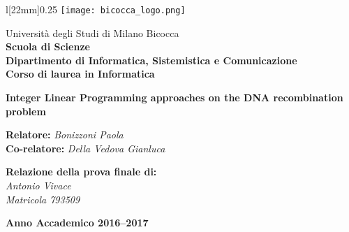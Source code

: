 \begin{titlepage}
\begin{onehalfspace}
	\begin{wrapfigure}[4]{l}[22mm]{0.25\textwidth}
		\vspace*{-7mm}
		\centering
		\texttt{[image: bicocca\_logo.png]}
	\end{wrapfigure}
	\par
	\noindent Università degli Studi di Milano Bicocca \\
	\textbf{Scuola di Scienze \\
			Dipartimento di Informatica, Sistemistica e Comunicazione \\
			Corso di laurea in Informatica}
\end{onehalfspace}

\vfill
\par

\begin{doublespace}
\begin{center}
	{\Huge \textbf{Integer Linear Programming approaches on the DNA recombination problem}}
\end{center}
\end{doublespace}

\vfill
\par

\begin{onehalfspace}
\begin{flushleft}
	{\large \textbf{Relatore:} \textit{Bonizzoni Paola} \\
			\textbf{Co-relatore:} \textit{Della Vedova Gianluca}}
\end{flushleft}

\vspace{8mm}
\par

\begin{flushright}
	{\large \textbf{Relazione della prova finale di:} \\
			\textit{Antonio Vivace} \\
			\textit{Matricola 793509}}
\end{flushright}
\end{onehalfspace}

\vfill
\par

\begin{center}
	{\large \textbf{Anno Accademico 2016--2017}}
\end{center}

\end{titlepage}